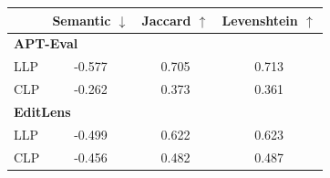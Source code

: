 \begin{tabular}{lccc}
\toprule
 & \textbf{Semantic} $\downarrow$ & \textbf{Jaccard} $\uparrow$ & \textbf{Levenshtein} $\uparrow$ \\
\midrule
\multicolumn{4}{l}{\textbf{APT-Eval~\cite{saha2025apt}}} \\
\midrule
LLP & -0.577 & 0.705 & 0.713 \\
CLP & -0.262 & 0.373 & 0.361 \\
\midrule
\multicolumn{4}{l}{\textbf{EditLens~\cite{thai2026editlens}}} \\
\midrule
LLP & -0.499 & 0.622 & 0.623 \\
CLP & -0.456 & 0.482 & 0.487 \\
\bottomrule
\end{tabular}
